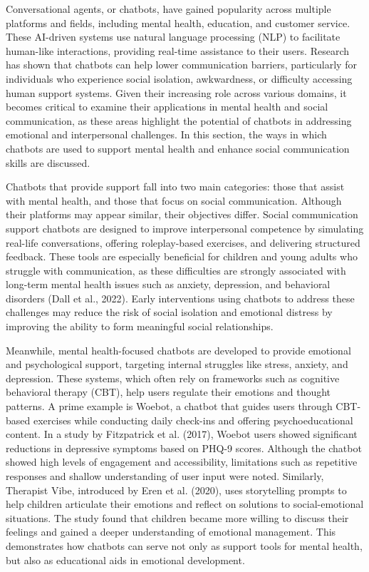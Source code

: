 Conversational agents, or chatbots, have gained popularity across multiple platforms and fields, including mental health, education, and customer service. These AI-driven systems use natural language processing (NLP) to facilitate human-like interactions, providing real-time assistance to their users. Research has shown that chatbots can help lower communication barriers, particularly for individuals who experience social isolation, awkwardness, or difficulty accessing human support systems. Given their increasing role across various domains, it becomes critical to examine their applications in mental health and social communication, as these areas highlight the potential of chatbots in addressing emotional and interpersonal challenges. In this section, the ways in which chatbots are used to support mental health and enhance social communication skills are discussed.

Chatbots that provide support fall into two main categories: those that assist with mental health, and those that focus on social communication. Although their platforms may appear similar, their objectives differ. Social communication support chatbots are designed to improve interpersonal competence by simulating real-life conversations, offering roleplay-based exercises, and delivering structured feedback. These tools are especially beneficial for children and young adults who struggle with communication, as these difficulties are strongly associated with long-term mental health issues such as anxiety, depression, and behavioral disorders (Dall et al., 2022). Early interventions using chatbots to address these challenges may reduce the risk of social isolation and emotional distress by improving the ability to form meaningful social relationships.

Meanwhile, mental health-focused chatbots are developed to provide emotional and psychological support, targeting internal struggles like stress, anxiety, and depression. These systems, which often rely on frameworks such as cognitive behavioral therapy (CBT), help users regulate their emotions and thought patterns. A prime example is Woebot, a chatbot that guides users through CBT-based exercises while conducting daily check-ins and offering psychoeducational content. In a study by Fitzpatrick et al. (2017), Woebot users showed significant reductions in depressive symptoms based on PHQ-9 scores. Although the chatbot showed high levels of engagement and accessibility, limitations such as repetitive responses and shallow understanding of user input were noted. Similarly, Therapist Vibe, introduced by Eren et al. (2020), uses storytelling prompts to help children articulate their emotions and reflect on solutions to social-emotional situations. The study found that children became more willing to discuss their feelings and gained a deeper understanding of emotional management. This demonstrates how chatbots can serve not only as support tools for mental health, but also as educational aids in emotional development.

